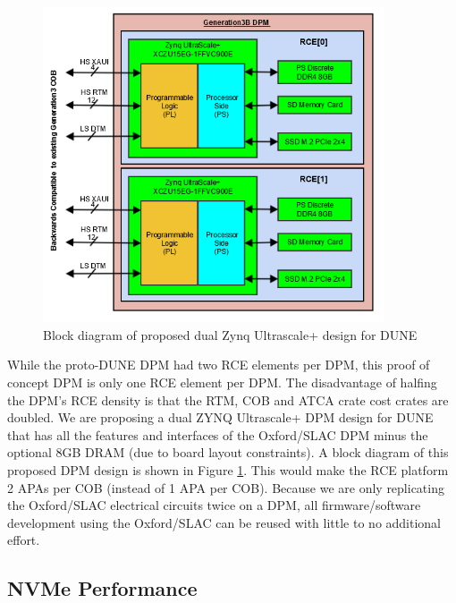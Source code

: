 \begin{figure}[tb]
\centering
\includegraphics[width=0.9\textwidth]{images/DpmUltrascaleBlockDiagram.png}
\caption{\label{fig:DpmUltrascaleBlockDiagram} Block diagram of proposed dual Zynq Ultrascale+ design for DUNE}
\end{figure}

While the proto-DUNE DPM had two RCE elements per DPM, this proof of concept DPM is only one RCE element per DPM.  The disadvantage of halfing the DPM's RCE density is that the RTM, COB and ATCA crate cost crates are doubled. We are proposing a dual ZYNQ Ultrascale+ DPM design for DUNE that has all the features and interfaces of the Oxford/SLAC DPM minus the optional 8GB DRAM (due to board layout constraints). A block diagram of this proposed DPM design is shown in Figure \ref{fig:DpmUltrascaleBlockDiagram}.  This would make the RCE platform 2 APAs per COB (instead of 1 APA per COB). Because we are only replicating the Oxford/SLAC electrical circuits twice on a DPM, all firmware/software development using the Oxford/SLAC can be reused with little to no additional effort. 

\subsection{NVMe Performance}
\label{sec:NVMe_Performance}

